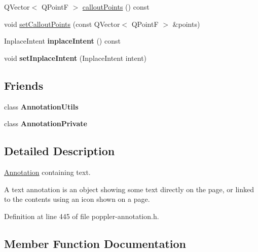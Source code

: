 \begin{DoxyCompactItemize}
Q\+Vector$<$ Q\+PointF $>$ \hyperlink{class_poppler_1_1_text_annotation_a9934edaa57440f27d2f757ae0def4451}{callout\+Points} () const
\item 
void \hyperlink{class_poppler_1_1_text_annotation_a4473ce56c0aedaada08d3eeabf07ec9c}{set\+Callout\+Points} (const Q\+Vector$<$ Q\+PointF $>$ \&points)
\item 
\mbox{\label{class_poppler_1_1_text_annotation_abecdcae81637fe8efcbfc13e4c2795f9}} 
Inplace\+Intent {\bfseries inplace\+Intent} () const
\item 
\mbox{\label{class_poppler_1_1_text_annotation_a5690561f7e7d19ff23f8fae1bce730c4}} 
void {\bfseries set\+Inplace\+Intent} (Inplace\+Intent intent)
\end{DoxyCompactItemize}
\subsection*{Friends}
\begin{DoxyCompactItemize}
\item 
\mbox{\label{class_poppler_1_1_text_annotation_a13daac1cbc1823e18498579fc26b344f}} 
class {\bfseries Annotation\+Utils}
\item 
\mbox{\label{class_poppler_1_1_text_annotation_add0bc3e32e560f9e9eb3025587c1ad54}} 
class {\bfseries Annotation\+Private}
\end{DoxyCompactItemize}


\subsection{Detailed Description}
\hyperlink{class_poppler_1_1_annotation}{Annotation} containing text. 

A text annotation is an object showing some text directly on the page, or linked to the contents using an icon shown on a page. 

Definition at line 445 of file poppler-\/annotation.\+h.



\subsection{Member Function Documentation}
\mbox{\label{class_poppler_1_1_text_annotation_a9934edaa57440f27d2f757ae0def4451}} 

